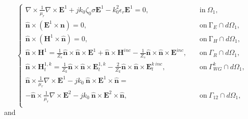\begin{equation}
\label{eq:FETID1}
\left\lbrace
\begin{aligned}
\nabla \times \frac{1}{\mu_r} \nabla \times {\mathbf{E}^1} + j k_0 \zeta_0 \sigma {\mathbf{E}^1} - k_0^2 \epsilon_r {\mathbf{E}^1} = 0,& \quad \mathrm{in} \ \Omega_1,\\[10pt]
\hat{\mathbf{n}} \times ( {\mathbf{E}^1} \times \hat{\mathbf{n}}) = 0, &\quad \mathrm{on} \ \mathrm{\Gamma}_E \cap d\Omega_1, \\[5pt]
\hat{\mathbf{n}} \times ( {\mathbf{H}^1} \times \hat{\mathbf{n}}) = 0, &\quad  \mathrm{on} \ \mathrm{\Gamma}_{H} \cap d\Omega_1, \\[5pt]
\hat{\mathbf{n}} \times \mathbf{H}^1 = \frac{1}{Z_s} \hat{\mathbf{n}} \times \hat{\mathbf{n}} \times \mathbf{E}^1 + \hat{\mathbf{n}} \times \mathbf{H}^{inc} - \frac{1}{Z_s} \hat{\mathbf{n}} \times \hat{\mathbf{n}} \times \mathbf{E}^{inc}, &\quad \mathrm{on} \ \Gamma_{R} \cap d\Omega_1, \\[5pt]
\hat{\mathbf{n}} \times \mathbf{H}_t^{1,k} = \frac{1}{Z_k} \hat{\mathbf{n}} \times \hat{\mathbf{n}} \times \mathbf{E}_t^{1,k} - \frac{2}{Z_k} \hat{\mathbf{n}} \times \hat{\mathbf{n}} \times \mathbf{E}_t^{k \ inc}, &\quad \mathrm{on} \ \Gamma_{WG}^k \cap d\Omega_1,\\[5pt]
\hat{\mathbf{n}} \times \frac{1}{\mu_r} \nabla \times \mathbf{E}^1 - jk_0 \ \hat{\mathbf{n}} \times \mathbf{E}^1 \times \hat{\mathbf{n}} = \qquad \qquad &\\ - \hat{\mathbf{n}} \times \frac{1}{\mu_r} \nabla \times \mathbf{E}^2 - jk_0 \ \hat{\mathbf{n}} \times \mathbf{E}^2 \times \hat{\mathbf{n}},  &\quad \mathrm{on} \ \Gamma_{12} \cap d\Omega_1, \\[5pt]
\end{aligned}
\right.
\end{equation}
%
\noindent and 
%
